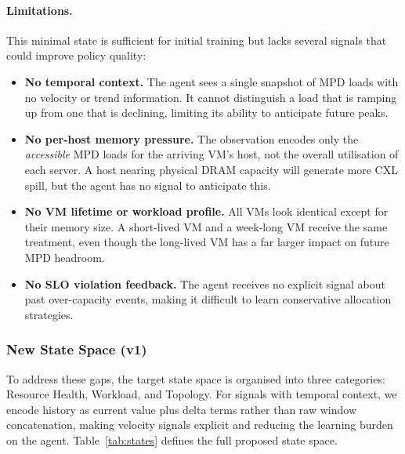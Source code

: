 \documentclass[11pt]{article}
\begin{document}
\paragraph{Limitations.}
This minimal state is sufficient for initial training but lacks several
signals that could improve policy quality:

\begin{itemize}
    \item \textbf{No temporal context.}  The agent sees a single snapshot
          of MPD loads with no velocity or trend information.  It cannot
          distinguish a load that is ramping up from one that is declining,
          limiting its ability to anticipate future peaks.
    \item \textbf{No per-host memory pressure.}  The observation encodes
          only the \emph{accessible} MPD loads for the arriving VM's host,
          not the overall utilisation of each server.  A host nearing
          physical DRAM capacity will generate more CXL spill, but the agent
          has no signal to anticipate this.
    \item \textbf{No VM lifetime or workload profile.}  All VMs look
          identical except for their memory size.  A short-lived VM and a
          week-long VM receive the same treatment, even though the long-lived
          VM has a far larger impact on future MPD headroom.
    \item \textbf{No SLO violation feedback.}  The agent receives no
          explicit signal about past over-capacity events, making it
          difficult to learn conservative allocation strategies.
\end{itemize}

\subsubsection*{New State Space (v1)}

To address these gaps, the target state space is organised into three
categories: Resource Health, Workload, and Topology.
For signals with temporal context, we encode history as current value plus
delta terms rather than raw window concatenation, making velocity signals
explicit and reducing the learning burden on the agent.
Table~\ref{tab:states} defines the full proposed state space.
\end{document}
